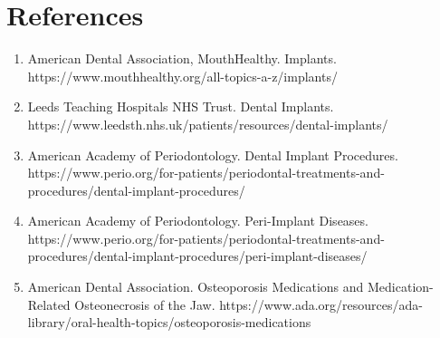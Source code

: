 \section*{References}
\begin{enumerate}
  \item American Dental Association, MouthHealthy. Implants. https://www.mouthhealthy.org/all-topics-a-z/implants/
  \item Leeds Teaching Hospitals NHS Trust. Dental Implants. https://www.leedsth.nhs.uk/patients/resources/dental-implants/
  \item American Academy of Periodontology. Dental Implant Procedures. https://www.perio.org/for-patients/periodontal-treatments-and-procedures/dental-implant-procedures/
  \item American Academy of Periodontology. Peri-Implant Diseases. https://www.perio.org/for-patients/periodontal-treatments-and-procedures/dental-implant-procedures/peri-implant-diseases/
  \item American Dental Association. Osteoporosis Medications and Medication-Related Osteonecrosis of the Jaw. https://www.ada.org/resources/ada-library/oral-health-topics/osteoporosis-medications
\end{enumerate}

\clearpage
